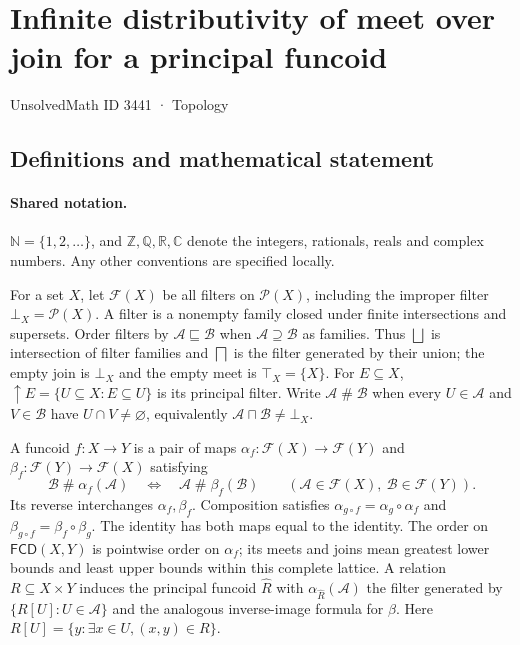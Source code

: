 \documentclass[11pt]{article}
\begin{document}
\setcounter{section}{3440}
\section{Infinite distributivity of meet over join for a principal funcoid}\label{3441}
{\small\sffamily UnsolvedMath ID 3441 · Topology}
\subsection{Definitions and mathematical statement}

\paragraph{Shared notation.}$\mathbb N=\{1,2,\ldots\}$, and $\mathbb Z,\mathbb Q,\mathbb R,\mathbb C$ denote the integers, rationals, reals and complex numbers. Any other conventions are specified locally.


For a set $X$, let $\mathcal F(X)$ be all filters on $\mathcal P(X)$, including the improper filter $\bot_X=\mathcal P(X)$. A filter is a nonempty family closed under finite intersections and supersets. Order filters by $\mathcal A\sqsubseteq\mathcal B$ when $\mathcal A\supseteq\mathcal B$ as families. Thus $\bigsqcup$ is intersection of filter families and $\bigsqcap$ is the filter generated by their union; the empty join is $\bot_X$ and the empty meet is $\top_X=\{X\}$. For $E\subseteq X$, $\uparrow E=\{U\subseteq X:E\subseteq U\}$ is its principal filter. Write $\mathcal A\mathrel{\#}\mathcal B$ when every $U\in\mathcal A$ and $V\in\mathcal B$ have $U\cap V\ne\varnothing$, equivalently $\mathcal A\sqcap\mathcal B\ne\bot_X$.

A funcoid $f:X\to Y$ is a pair of maps $\alpha_f:\mathcal F(X)\to\mathcal F(Y)$ and $\beta_f:\mathcal F(Y)\to\mathcal F(X)$ satisfying
\[
 \mathcal B\mathrel{\#}\alpha_f(\mathcal A)
 \quad\Longleftrightarrow\quad
 \mathcal A\mathrel{\#}\beta_f(\mathcal B)
 \qquad(\mathcal A\in\mathcal F(X),\ \mathcal B\in\mathcal F(Y)).
\]
Its reverse interchanges $\alpha_f,\beta_f$. Composition satisfies $\alpha_{g\circ f}=\alpha_g\circ\alpha_f$ and $\beta_{g\circ f}=\beta_f\circ\beta_g$. The identity has both maps equal to the identity. The order on $\mathsf{FCD}(X,Y)$ is pointwise order on $\alpha_f$; its meets and joins mean greatest lower bounds and least upper bounds within this complete lattice. A relation $R\subseteq X\times Y$ induces the principal funcoid $\widehat R$ with $\alpha_{\widehat R}(\mathcal A)$ the filter generated by $\{R[U]:U\in\mathcal A\}$ and the analogous inverse-image formula for $\beta$. Here $R[U]=\{y:\exists x\in U,(x,y)\in R\}$.
\end{document}
